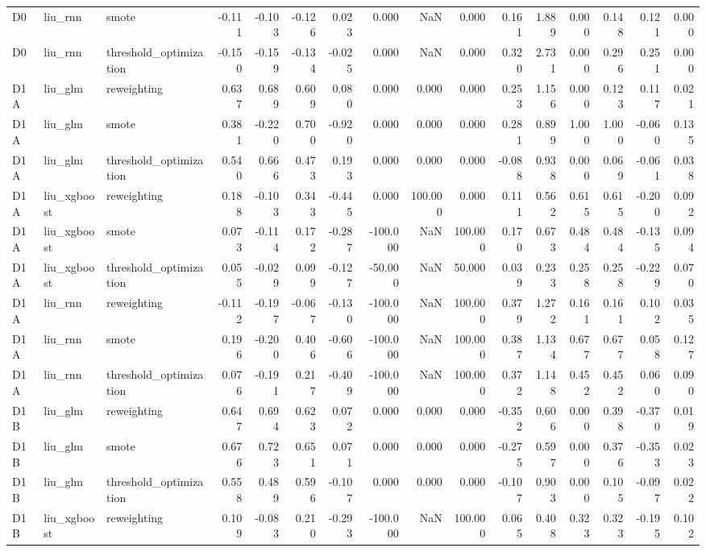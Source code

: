 \begin{tabular}{lllrrrrrrrrrrrrr}
D0 & liu_rnn & smote & -0.111 & -0.103 & -0.126 & 0.023 & 0.000 & NaN & 0.000 & 0.161 & 1.889 & 0.000 & 0.148 & 0.121 & 0.000 \\
D0 & liu_rnn & threshold_optimization & -0.150 & -0.159 & -0.134 & -0.025 & 0.000 & NaN & 0.000 & 0.320 & 2.731 & 0.000 & 0.296 & 0.251 & 0.000 \\
D1A & liu_glm & reweighting & 0.637 & 0.689 & 0.609 & 0.080 & 0.000 & 0.000 & 0.000 & 0.253 & 1.156 & 0.000 & 0.123 & 0.117 & 0.021 \\
D1A & liu_glm & smote & 0.381 & -0.220 & 0.700 & -0.920 & 0.000 & 0.000 & 0.000 & 0.281 & 0.899 & 1.000 & 1.000 & -0.060 & 0.135 \\
D1A & liu_glm & threshold_optimization & 0.540 & 0.666 & 0.473 & 0.193 & 0.000 & 0.000 & 0.000 & -0.088 & 0.938 & 0.000 & 0.069 & -0.061 & 0.038 \\
D1A & liu_xgboost & reweighting & 0.188 & -0.103 & 0.343 & -0.445 & 0.000 & 100.000 & 0.000 & 0.111 & 0.562 & 0.615 & 0.615 & -0.200 & 0.092 \\
D1A & liu_xgboost & smote & 0.073 & -0.114 & 0.172 & -0.287 & -100.000 & NaN & 100.000 & 0.170 & 0.673 & 0.484 & 0.484 & -0.135 & 0.094 \\
D1A & liu_xgboost & threshold_optimization & 0.055 & -0.029 & 0.099 & -0.127 & -50.000 & NaN & 50.000 & 0.039 & 0.233 & 0.258 & 0.258 & -0.229 & 0.070 \\
D1A & liu_rnn & reweighting & -0.112 & -0.197 & -0.067 & -0.130 & -100.000 & NaN & 100.000 & 0.379 & 1.272 & 0.161 & 0.161 & 0.102 & 0.035 \\
D1A & liu_rnn & smote & 0.196 & -0.200 & 0.406 & -0.606 & -100.000 & NaN & 100.000 & 0.387 & 1.134 & 0.677 & 0.677 & 0.058 & 0.127 \\
D1A & liu_rnn & threshold_optimization & 0.076 & -0.191 & 0.217 & -0.409 & -100.000 & NaN & 100.000 & 0.372 & 1.148 & 0.452 & 0.452 & 0.060 & 0.090 \\
D1B & liu_glm & reweighting & 0.647 & 0.694 & 0.623 & 0.072 & 0.000 & 0.000 & 0.000 & -0.352 & 0.606 & 0.000 & 0.398 & -0.370 & 0.019 \\
D1B & liu_glm & smote & 0.676 & 0.723 & 0.651 & 0.071 & 0.000 & 0.000 & 0.000 & -0.275 & 0.597 & 0.000 & 0.376 & -0.353 & 0.023 \\
D1B & liu_glm & threshold_optimization & 0.558 & 0.489 & 0.596 & -0.107 & 0.000 & 0.000 & 0.000 & -0.107 & 0.903 & 0.000 & 0.105 & -0.097 & 0.022 \\
D1B & liu_xgboost & reweighting & 0.109 & -0.083 & 0.210 & -0.293 & -100.000 & NaN & 100.000 & 0.065 & 0.408 & 0.323 & 0.323 & -0.195 & 0.102 \\

\end{tabular}
